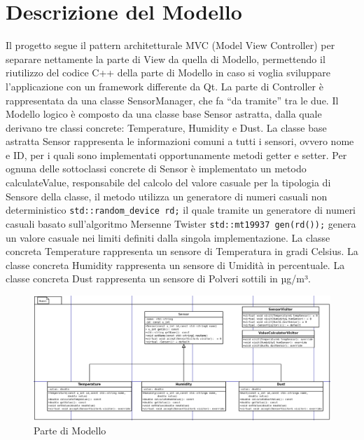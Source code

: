 \documentclass{article}
\begin{document}
\section{Descrizione del Modello}
Il progetto segue il pattern architetturale MVC (Model View Controller) per separare nettamente la parte di View da quella di Modello, permettendo il riutilizzo del codice C++ della parte di Modello in caso si voglia sviluppare l’applicazione con un framework differente da Qt. La parte di Controller è rappresentata da una classe SensorManager, che fa “da tramite” tra le due.
Il Modello logico è composto da una classe base Sensor astratta, dalla quale derivano tre classi concrete: Temperature, Humidity e Dust. 
La classe base astratta Sensor rappresenta le informazioni comuni a tutti i sensori, ovvero nome e ID, per i quali sono implementati opportunamente metodi getter e setter. Per ognuna delle sottoclassi concrete di Sensor è implementato un metodo calculateValue, responsabile del calcolo del valore casuale per la tipologia di Sensore della classe, il metodo utilizza un generatore di numeri casuali non deterministico \verb|std::random_device rd;| il quale tramite un generatore di numeri casuali basato sull’algoritmo Mersenne Twister 
\verb|std::mt19937 gen(rd());| genera un valore casuale nei limiti definiti dalla singola implementazione. 
La classe concreta Temperature rappresenta un sensore di Temperatura in gradi Celsius.  
La classe concreta Humidity rappresenta un sensore di Umidità in percentuale.
La classe concreta Dust rappresenta un sensore di Polveri sottili in µg/m³.


\begin{figure}[h]
    \centering
    \includegraphics[width=\textwidth]{Logica.png}
    \caption{Parte di Modello}
    \label{fig:Parte di Modello}
\end{figure}
\end{document}
